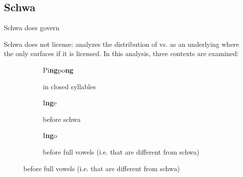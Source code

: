 \subsection[Schwa]{Schwa\footnotemark}
Schwa does govern

Schwa does not license: \cite{scheer2004} analyzes the distribution
of \textipa{[N]} vs. \textipa{[Ng]} as an underlying 
where the  only surfaces if it is licensed.
In this analysis, three contexts are examined:

\begin{figure}[h]
  \captionsetup[subfigure]{
    labelformat=simple,        %
    labelsep=period,           %
    justification=raggedright, %
    singlelinecheck=false,     %
    position=top,              %
  }
  \begin{subfigure}[T]{.5\textwidth}
    \caption{\ti{[N]} in closed syllables}
    \label{fig:ng:closed syllable}
    \centering
    \begin{structure}
      \Ng[nolic]
      \emptyV[gov]
      \Ng[nolic]
      \fen
    \end{structure}
    Pi\textbf{ng}po\textbf{ng} \ti{[pINpON]}
  \end{subfigure}
  \hfill
  \begin{subfigure}[T]{.45\textwidth}
    \caption{\ti{[N]} before schwa}
    \label{fig:ng:before schwa}
    \parbox{12em}{
      \centering
      \begin{structure}
        \Ng[nolic]
        \V{\textschwa}
      \end{structure}
      I\textbf{ng}e \ti{[PIN@]}
    }
  \end{subfigure}

  \vspace{1.5em}
  \begin{subfigure}[T]{\textwidth}
    \caption{\ti{[Ng]} before full vowels (i.e. that are different from schwa)}
    \label{fig:ng:before full vowel}
    \parbox{.25\textwidth}{
      \centering
      \begin{structure}
        \Ng[lic]
      \end{structure}
      I\textbf{ng}o \ti{[PINgo:]}
    }
  \end{subfigure}

\end{figure}


